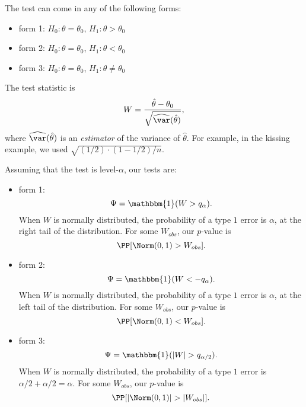 The test can come in any of the following forms: 
\begin{itemize}
    \item form 1: $H_0: \theta = \theta_0$, $H_1: \theta > \theta_0$
    \item form 2: $H_0: \theta = \theta_0$, $H_1: \theta < \theta_0$
    \item form 3: $H_0: \theta = \theta_0$, $H_1: \theta \neq \theta_0$
\end{itemize}

The test statistic is 
\[W = \frac{\hat{\theta}-\theta_0}{\sqrt{\widehat{\var}(\hat{\theta})}},\]
where $\widehat{\var}(\hat{\theta})$ is an \textit{estimator} of the variance of $\hat{\theta}$. For example, in the kissing example, we used $\sqrt{(1/2)\cdot (1-1/2)/n}$. 

Assuming that the test is level-$\alpha$, our tests are:
\begin{itemize}
    \item form 1: 
    \[\Psi = \mathbbm{1}(W > q_{\alpha}).\]
    When $W$ is normally distributed, the probability of a type $1$ error is $\alpha$, at the right tail of the distribution. For some $W_{obs}$, our $p$-value is 
    \[\PP[\Norm(0,1) > W_{obs}].\]
    \item form 2: 
    \[\Psi = \mathbbm{1}(W < -q_{\alpha}).\]
    When $W$ is normally distributed, the probability of a type $1$ error is $\alpha$, at the left tail of the distribution. For some $W_{obs}$, our $p$-value is 
    \[\PP[\Norm(0,1) < W_{obs}].\]
    \item form 3: 
    \[\Psi = \mathbbm{1}(\vert W\vert > q_{\alpha/2}).\]
    When $W$ is normally distributed, the probability of a type $1$ error is $\alpha/2 + \alpha/2 = \alpha$. For some $W_{obs}$, our $p$-value is 
    \[\PP[\vert \Norm(0,1)\vert > \vert W_{obs}\vert].\]
\end{itemize}




